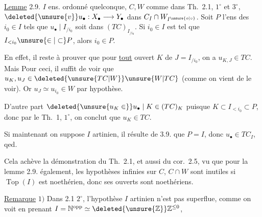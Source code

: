 
\uline{Lemme} 2.9. $I$ ens. ordonné quelconque, $C,W$ comme dans Th.\ 2.1, $1^\circ$ et $3^\circ$, $\deleted{\unsure{v}}u_\bullet:X_\bullet\longrightarrow Y_\bullet$ dans $C_I\cap W_{I^{\unsure{o|\circ}}}$. Soit $P$ l'ens des $i_0\in I$ tels que $u_\bullet\mid I_{/i_0}$ soit dans $(TC)_{I_{/i_0}}$.  Si $i_0\in I$ est tel que $I_{<i_0}\unsure{\in|\subset}P$, alors $i_0\in P$.

En effet,  il reste à prouver que pour \uline{tout} ouvert $K$ de $J=I_{/i_0}$,  on a $u_{K,J}\in TC$. Mais  Pour ceci, il suffit de voir que $u_K,u_J\in\deleted{\unsure{TC|W}}\unsure{W|TC}$ (comme on vient de le voir). Or $u_J\simeq u_{i_0}\in W$ par hypothèse.

D'autre part $\deleted{\unsure{u_K\in}}u_\bullet\mid K\in(TC)_K$  puisque $K\subset I_{<i_0}\subset P$, donc par le Th.\ 1, $1^\circ$, on conclut que $u_K\in TC$.

Si maintenant on suppose $I$ artinien, il résulte de 3.9. que $P=I$, donc $u_\bullet\in TC_I$, qed.

Cela achève la démonstration du Th.\ 2.1, et aussi du cor.\ 2.5, vu que pour la   lemme 2.9. également, les hypothèses infinies sur $C$, $C\cap W$ sont inutiles si $\operatorname{Top}(I)$ est noethérien, donc ses ouverts   sont  noethériens.

\uline{Remarque} $1)$ Dans 2.1 $2^\circ$, l'hypothèse $I$ artinien n'est pas superflue, comme on voit en prenant $I=\mathbb N^{\mathrm{opp}}\simeq\deleted{\unsure{\mathbb Z}}\mathbb Z^{\le0}$,


